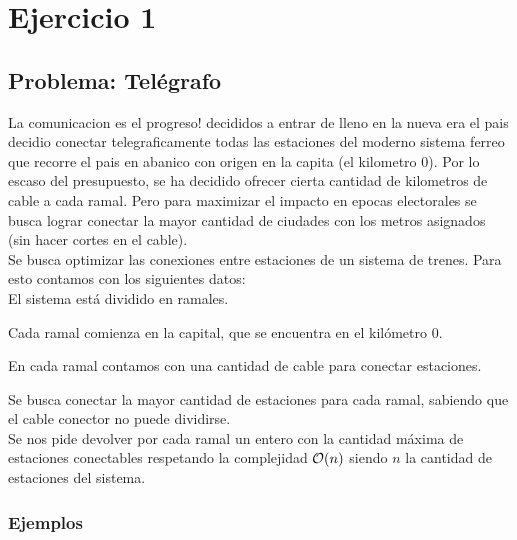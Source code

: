 \section{Ejercicio 1}
\subsection{Problema: Tel\'egrafo}

La comunicacion es el progreso! decididos a entrar de lleno en la nueva era el pais decidio conectar telegraficamente todas las estaciones del moderno sistema ferreo que recorre el pais en abanico con origen en la capita (el kilometro 0). Por lo escaso del presupuesto, se ha decidido ofrecer cierta cantidad de kilometros de cable a cada ramal. Pero para maximizar el impacto en epocas electorales se busca lograr conectar la mayor cantidad de ciudades con los metros asignados (sin hacer cortes en el cable).\\

 Se busca optimizar las conexiones entre estaciones de un sistema de trenes. Para esto contamos con los siguientes datos:\\   
 
 El sistema est\'a dividido en ramales.
 
 Cada ramal comienza en la capital, que se encuentra en el kil\'ometro 0.
 
 En cada ramal contamos con una cantidad de cable para conectar estaciones.
 
 Se busca conectar la mayor cantidad de estaciones para cada ramal, sabiendo que el cable conector no puede dividirse.\\
 
 Se nos pide devolver por cada ramal un entero con la cantidad m\'axima de estaciones conectables respetando la complejidad $\mathcal{O} (n)$ siendo $n$ la cantidad de estaciones del sistema.

\subsubsection{Ejemplos}

